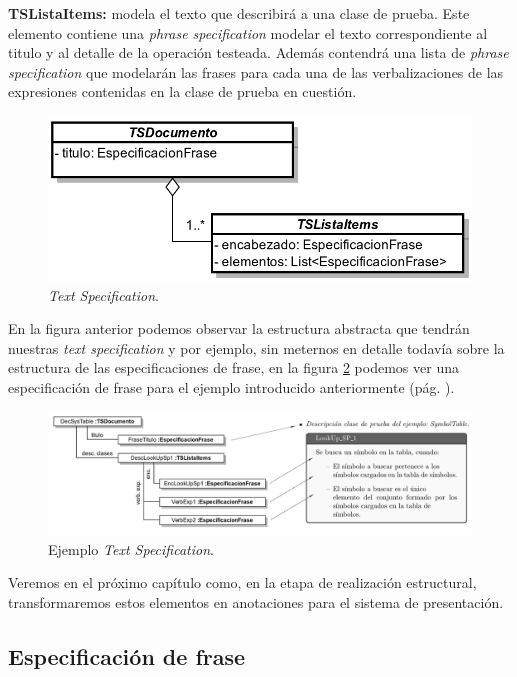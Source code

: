 \medskip
\noindent
\textbf{TSListaItems:} modela el texto que describirá a una clase de prueba. Este elemento contiene una \emph{phrase specification} modelar el texto correspondiente al titulo y al detalle de la operación testeada. Además contendrá una lista de \emph{phrase specification} que modelarán las frases para cada una de las verbalizaciones de las expresiones contenidas en la clase de prueba en cuestión.

\begin{figure}[H]
  	\centering
	\includegraphics[scale=0.3]{img/text_spec.png}
	\caption{\emph{Text Specification}.}
  	\label{fig:text_spec}
\end{figure}

En la figura anterior podemos observar la estructura abstracta que tendrán nuestras \emph{text specification} y por ejemplo, sin meternos en detalle todavía sobre la estructura de las especificaciones de frase, en la figura \ref{fig:text_spec} podemos ver una especificación de frase para el ejemplo introducido anteriormente (pág. \pageref{fig:ej_corpus}).

\begin{figure}[H]
  	\centering
	\includegraphics[scale=0.35]{img/ej_text_spec.png}
	\caption{Ejemplo \emph{Text Specification}.}
  	\label{fig:text_spec}
\end{figure}

Veremos en el próximo capítulo como, en la etapa de realización estructural, transformaremos estos elementos en anotaciones para el sistema de presentación.

\subsection{Especificación de frase}

